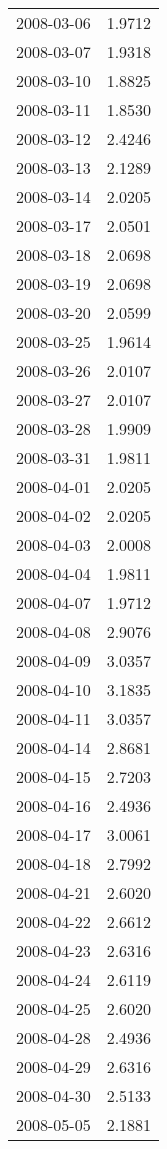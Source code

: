 \begin{tabular}{lr}
2008-03-06 &      1.9712 \\
2008-03-07 &      1.9318 \\
2008-03-10 &      1.8825 \\
2008-03-11 &      1.8530 \\
2008-03-12 &      2.4246 \\
2008-03-13 &      2.1289 \\
2008-03-14 &      2.0205 \\
2008-03-17 &      2.0501 \\
2008-03-18 &      2.0698 \\
2008-03-19 &      2.0698 \\
2008-03-20 &      2.0599 \\
2008-03-25 &      1.9614 \\
2008-03-26 &      2.0107 \\
2008-03-27 &      2.0107 \\
2008-03-28 &      1.9909 \\
2008-03-31 &      1.9811 \\
2008-04-01 &      2.0205 \\
2008-04-02 &      2.0205 \\
2008-04-03 &      2.0008 \\
2008-04-04 &      1.9811 \\
2008-04-07 &      1.9712 \\
2008-04-08 &      2.9076 \\
2008-04-09 &      3.0357 \\
2008-04-10 &      3.1835 \\
2008-04-11 &      3.0357 \\
2008-04-14 &      2.8681 \\
2008-04-15 &      2.7203 \\
2008-04-16 &      2.4936 \\
2008-04-17 &      3.0061 \\
2008-04-18 &      2.7992 \\
2008-04-21 &      2.6020 \\
2008-04-22 &      2.6612 \\
2008-04-23 &      2.6316 \\
2008-04-24 &      2.6119 \\
2008-04-25 &      2.6020 \\
2008-04-28 &      2.4936 \\
2008-04-29 &      2.6316 \\
2008-04-30 &      2.5133 \\
2008-05-05 &      2.1881 \\

\end{tabular}
